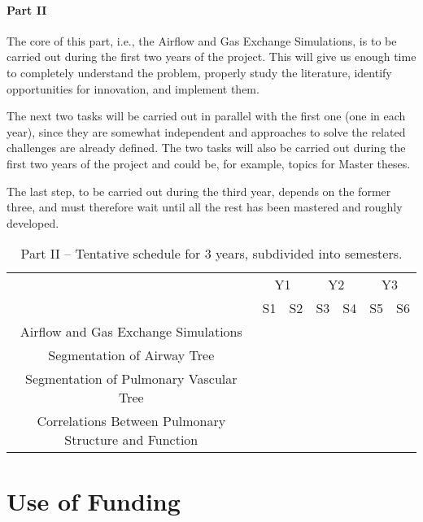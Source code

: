 \paragraph{Part II}

The core of this part, i.e., the Airflow and Gas Exchange Simulations, is to be carried out during the first two years of the project. This will give us enough time to completely understand the problem, properly study the literature, identify opportunities for innovation, and implement them. 

The next two tasks will be carried out in parallel with the first one (one in each year), since they are somewhat independent and approaches to solve the related challenges are already defined. The two tasks will also be carried out during the first two years of the project and could be, for example, topics for Master theses. 

The last step, to be carried out during the third year, depends on the former three, and must therefore wait until all the rest has been mastered and roughly developed. 

\begin{table}[h]\centering
\begin{tabular}{c|c|c|c|c|c|c|}
\cline{2-7}
 & \multicolumn{2}{|c|}{Y1} & \multicolumn{2}{|c|}{Y2} & \multicolumn{2}{|c|}{Y3} \\ \cline{2-7}
 & S1 & S2 & S3 & S4 & S5 & S6 \\ \hline
\multicolumn{1}{|c|}{Airflow and Gas Exchange Simulations} & \cellcolor{green} & \cellcolor{green} & \cellcolor{green} & \cellcolor{green} & & \\ \hline
\multicolumn{1}{|c|}{Segmentation of Airway Tree} & \cellcolor{green} & \cellcolor{green} & & & & \\ \hline
\multicolumn{1}{|c|}{Segmentation of Pulmonary Vascular Tree} & &  & \cellcolor{green} & \cellcolor{green} & & \\ \hline
\multicolumn{1}{|c|}{Correlations Between Pulmonary Structure and Function} & & & & & \cellcolor{green} & \cellcolor{green} \\ \hline
\end{tabular}
\caption{Part II -- Tentative schedule for 3 years, subdivided into semesters.}
\label{tab:schedule2}
\end{table}


\section{Use of Funding}


